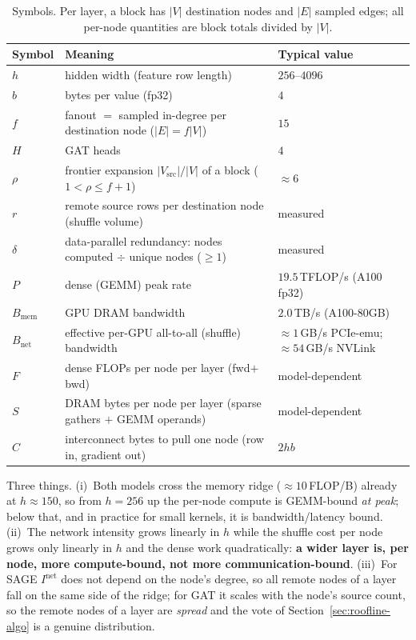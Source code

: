 \begin{table}[h]
\centering
\caption{Symbols. Per layer, a block has $|V|$ destination nodes and $|E|$ sampled edges;
all per-node quantities are block totals divided by $|V|$.}
\label{tab:roofline-notation}
\small
\begin{tabular}{l p{7.6cm} p{4.6cm}}
\toprule
Symbol & Meaning & Typical value \\
\midrule
$h$ & hidden width (feature row length) & $256$--$4096$ \\
$b$ & bytes per value (fp32) & $4$ \\
$f$ & fanout $=$ sampled in-degree per destination node ($|E| = f|V|$) & $15$ \\
$H$ & GAT heads & $4$ \\
$\rho$ & frontier expansion $|V_{\mathrm{src}}|/|V|$ of a block ($1<\rho\le f{+}1$) & $\approx 6$ \\
$r$ & remote source rows per destination node (shuffle volume) & measured \\
$\delta$ & data-parallel redundancy: nodes computed $\div$ unique nodes ($\ge 1$) & measured \\
\midrule
$P$ & dense (GEMM) peak rate & $19.5$\,TFLOP/s (A100 fp32) \\
$B_{\mathrm{mem}}$ & GPU DRAM bandwidth & $2.0$\,TB/s (A100-80GB) \\
$B_{\mathrm{net}}$ & effective per-GPU all-to-all (shuffle) bandwidth & $\approx 1$\,GB/s PCIe-emu; $\approx 54$\,GB/s NVLink \\
\midrule
$F$ & dense FLOPs per node per layer (fwd$+$bwd) & model-dependent \\
$S$ & DRAM bytes per node per layer (sparse gathers $+$ GEMM operands) & model-dependent \\
$C$ & interconnect bytes to pull one node (row in, gradient out) & $2hb$ \\
\bottomrule
\end{tabular}
\end{table}


Three things. (i)~Both models cross the memory ridge ($\approx 10$\,FLOP/B) already at
$h\approx 150$, so from $h=256$ up the per-node compute is GEMM-bound \emph{at peak}; below
that, and in practice for small kernels, it is bandwidth/latency bound. (ii)~The network
intensity grows linearly in $h$ while the shuffle cost per node grows only linearly in $h$ and
the dense work quadratically: \textbf{a wider layer is, per node, more compute-bound, not more
communication-bound}. (iii)~For SAGE $I^{\mathrm{net}}$ does not depend on the node's degree,
so all remote nodes of a layer fall on the same side of the ridge; for GAT it scales with the
node's source count, so the remote nodes of a layer are \emph{spread} and the vote of
Section~\ref{sec:roofline-algo} is a genuine distribution.

